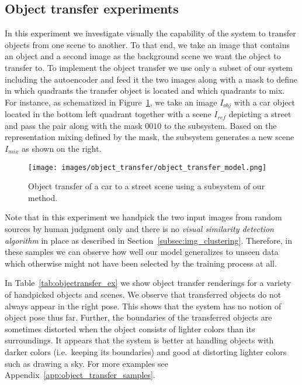 \documentclass[a4paper,12pt]{report}
\begin{document}
\subsection{Object transfer experiments}\label{subsubsec:objTransfExp}
In this experiment we investigate visually the capability of the system to transfer objects from one scene to another. To that end, we take an image that contains an object and a second image as the background scene we want the object to transfer to. To implement the object transfer we use only a subset of our system including the autoencoder and feed it the two images along with a mask to define in which quadrants the transfer object is located and which quadrants to mix. For instance, as schematized in Figure~\ref{fig:objectransfer_arch}, we take an image $I_{obj}$ with a car object located in the bottom left quadrant together with a scene $I_{ref}$ depicting a street and pass the pair along with the mask $0010$ to the subsystem. Based on the representation mixing defined by the mask, the subsystem generates a new scene $I_{mix}$ as shown on the right.
\begin{figure}[ht]
\centering
\texttt{[image: images/object\_transfer/object\_transfer\_model.png]}
\caption[Object transfer of a car to a street scene.]{Object transfer of a car to a street scene using a subsystem of our method.}
\label{fig:objectransfer_arch}
\end{figure}
Note that in this experiment we handpick the two input images from random sources by human judgment only and there is no \textit{visual similarity detection algorithm} in place as described in Section~\ref{subsec:img_clustering}. Therefore, in these samples we can observe how well our model generalizes to unseen data which otherwise might not have been selected by the training process at all.

In Table~\ref{tab:objectransfer_ex} we show object transfer renderings for a variety of handpicked objects and scenes. We observe that transferred objects do not always appear in the right pose. This shows that the system has no notion of object pose thus far. Further, the boundaries of the transferred objects are sometimes distorted when the object consists of lighter colors than its surroundings. It appears that the system is better at handling objects with darker colors (i.e.\ keeping its boundaries) and good at distorting lighter colors such as drawing a sky. For more examples see Appendix~\ref{app:object_transfer_samples}.

\end{document}
